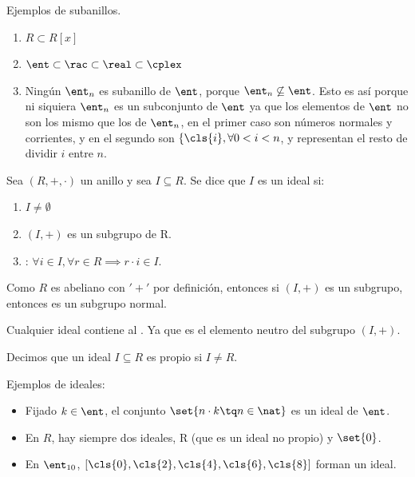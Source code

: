 \begin{example} Ejemplos de subanillos.
	\begin{enumerate}
		\item $R \subset R[x]$
		\item $\ent \subset \rac \subset \real \subset \cplex$
		\item Ningún $\ent_n$ es subanillo de $\ent$, porque $\ent_n \not \subseteq \ent$. Esto es así porque ni siquiera $\ent_n$ es un subconjunto de $\ent$ ya que los elementos de $\ent$ no son los mismo que los de $\ent_n$, en el primer caso son números normales y corrientes, y en el segundo son $\{\cls{i},  \forall 0 < i < n$, y representan el resto de dividir $i$ entre $n$.
	\end{enumerate}
\end{example}


\begin{defn}[Ideal] \label{def:Ideal} %
Sea $(R,+,\cdot)$ un anillo y sea $I \subseteq R$. Se dice que $I$ es un ideal si:

	\begin{enumerate}
		\item $I \neq \emptyset$
		\item $(I, +)$ es un subgrupo de R.
		\item {}: $\forall i \in I, \forall r \in R \implies r\cdot i \in I$.
	\end{enumerate}
\end{defn}

\obs Como $R$ es abeliano con  $'+'$ por definición, entonces si $(I,+)$ es un subgrupo, entonces es un subgrupo normal.

\obs Cualquier ideal contiene al \zero. Ya que es el elemento neutro del subgrupo $(I,+)$.

\begin{defn}
	Decimos que un ideal $I \subseteq R$ es propio si $I \neq R$.
\end{defn}

\begin{example} Ejemplos de ideales:
	\begin{itemize}
		\item Fijado $k \in \ent$, el conjunto $\set{n\cdot k \tq n \in \nat }$ es un ideal de $\ent$.
		\item En $R$, hay siempre dos ideales, R (que es un ideal no propio) y $\set{0}$.
		\item En $\ent_{10}$, $[\cls{0},\cls{2},\cls{4},\cls{6},\cls{8} ]$ forman un ideal.
	\end{itemize}
\end{example}

